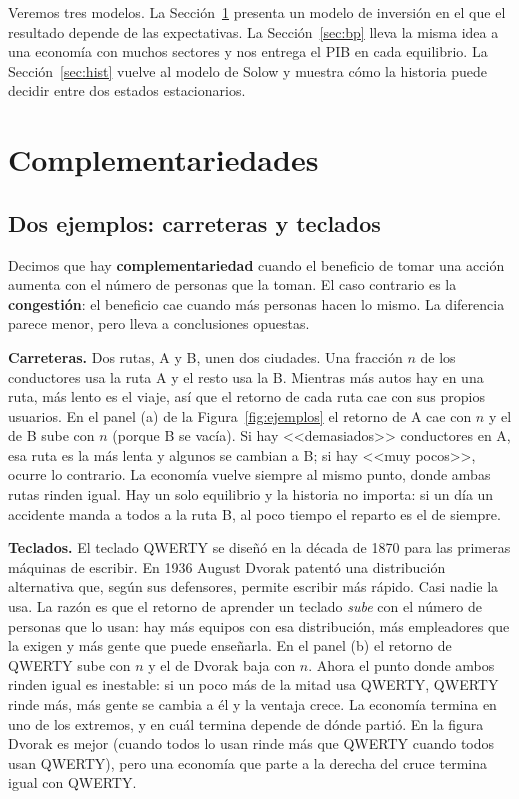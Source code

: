 \documentclass[12pt,letterpaper]{article}
\begin{document}
Veremos tres modelos. La Sección~\ref{sec:comp} presenta un modelo de inversión en el que el resultado depende de las expectativas. La Sección~\ref{sec:bp} lleva la misma idea a una economía con muchos sectores y nos entrega el PIB en cada equilibrio. La Sección~\ref{sec:hist} vuelve al modelo de Solow y muestra cómo la historia puede decidir entre dos estados estacionarios.

\section{Complementariedades}\label{sec:comp}

\subsection{Dos ejemplos: carreteras y teclados}

Decimos que hay \textbf{complementariedad} cuando el beneficio de tomar una acción aumenta con el número de personas que la toman. El caso contrario es la \textbf{congestión}: el beneficio cae cuando más personas hacen lo mismo. La diferencia parece menor, pero lleva a conclusiones opuestas.

\textbf{Carreteras.} Dos rutas, A y B, unen dos ciudades. Una fracción $n$ de los conductores usa la ruta A y el resto usa la B. Mientras más autos hay en una ruta, más lento es el viaje, así que el retorno de cada ruta cae con sus propios usuarios. En el panel (a) de la Figura~\ref{fig:ejemplos} el retorno de A cae con $n$ y el de B sube con $n$ (porque B se vacía). Si hay <<demasiados>> conductores en A, esa ruta es la más lenta y algunos se cambian a B; si hay <<muy pocos>>, ocurre lo contrario. La economía vuelve siempre al mismo punto, donde ambas rutas rinden igual. Hay un solo equilibrio y la historia no importa: si un día un accidente manda a todos a la ruta B, al poco tiempo el reparto es el de siempre.

\textbf{Teclados.} El teclado QWERTY se diseñó en la década de 1870 para las primeras máquinas de escribir. En 1936 August Dvorak patentó una distribución alternativa que, según sus defensores, permite escribir más rápido. Casi nadie la usa. La razón es que el retorno de aprender un teclado \emph{sube} con el número de personas que lo usan: hay más equipos con esa distribución, más empleadores que la exigen y más gente que puede enseñarla. En el panel (b) el retorno de QWERTY sube con $n$ y el de Dvorak baja con $n$. Ahora el punto donde ambos rinden igual es inestable: si un poco más de la mitad usa QWERTY, QWERTY rinde más, más gente se cambia a él y la ventaja crece. La economía termina en uno de los extremos, y en cuál termina depende de dónde partió. En la figura Dvorak es mejor (cuando todos lo usan rinde más que QWERTY cuando todos usan QWERTY), pero una economía que parte a la derecha del cruce termina igual con QWERTY.
\end{document}

